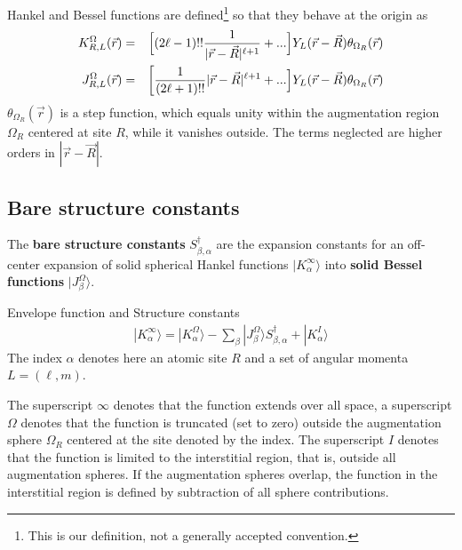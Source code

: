 \documentclass[11pt,a4paper]{report}
\begin{document}
Hankel and Bessel functions are defined\footnote{This is our
  definition, not a generally accepted convention.} so that they
behave at the origin as
\begin{eqnarray}
K^\Omega_{R,L}(\vec{r})&=&
\Bigl[(2\ell-1)!! \frac{1}{|\vec{r}-\vec{R}|^{\ell+1}} 
+...\Bigr]
Y_L(\vec{r}-\vec{R})\theta_{\Omega_R}(\vec{r})
\\
J^\Omega_{R,L}(\vec{r})&=&
\biggl[\frac{1}{(2\ell+1)!!} |\vec{r}-\vec{R}|^{\ell+1} 
+...\Bigr]Y_L(\vec{r}-\vec{R})\theta_{\Omega_R}(\vec{r})
\end{eqnarray}
$\theta_{\Omega_R}(\vec{r})$ is a step function, which equals unity within the
augmentation region $\Omega_R$ centered at site $R$, while it vanishes
outside. The terms neglected are higher orders in $|\vec{r}-\vec{R}|$.

\subsection{Bare structure constants}
The \textbf{bare structure constants}
$S^\dagger_{\beta,\alpha}$ are the expansion constants for an
off-center expansion of solid spherical Hankel functions $|K_{\alpha}^\infty\rangle$ into \textbf{solid Bessel
  functions} $|J^\Omega_{\beta}\rangle$.
\begin{myshadowminipage}{Envelope function and Structure constants}
\begin{eqnarray}
|K_{\alpha}^\infty\rangle=|K^\Omega_{\alpha}\rangle
-\sum_{\beta}|J^\Omega_{\beta}\rangle S^\dagger_{\beta,\alpha}
+|K^I_{\alpha}\rangle
\end{eqnarray}
The index $\alpha$ denotes here an atomic site $R$ and a set of
angular momenta $L=(\ell,m)$.
\end{myshadowminipage}

The superscript $\infty$ denotes that the function extends over all
space, a superscript $\Omega$ denotes that the function is truncated
(set to zero) outside the augmentation sphere $\Omega_{R}$ centered at
the site denoted by the index. The superscript $I$ denotes that the
function is limited to the interstitial region, that is, outside all
augmentation spheres. If the augmentation spheres overlap, the
function in the interstitial region is defined by subtraction of all
sphere contributions.
\end{document}
